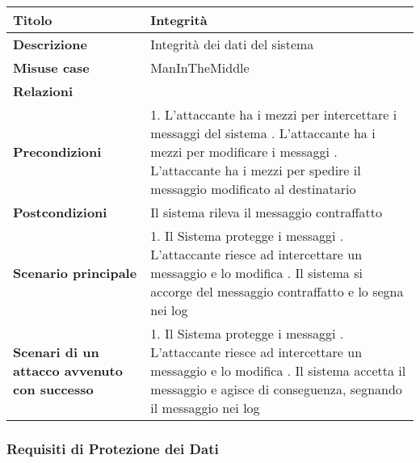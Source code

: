 \begin{tabular} {|P{4cm}|P{11.5cm}|}
  \hline
  \textbf{Titolo}                                      & Integrità                                     \\
  \hline
  \textbf{Descrizione}                                 & Integrità dei dati del sistema                \\
  \hline
  \textbf{Misuse case}                                 & ManInTheMiddle                                \\
  \hline
  \textbf{Relazioni}                                   &                                               \\
  \hline
  \textbf{Precondizioni}                               & 1. L'attaccante ha i mezzi per intercettare i
  messaggi del sistema . L'attaccante ha i mezzi per modificare i messaggi
  . L'attaccante ha i mezzi per spedire il messaggio modificato al
  destinatario                                                                                         \\
  \hline
  \textbf{Postcondizioni}                              & Il sistema rileva il messaggio contraffatto   \\
  \hline
  \textbf{Scenario principale}                         & 1. Il Sistema protegge i messaggi . L'attaccante riesce ad intercettare un messaggio e lo modifica . Il
  sistema si accorge del messaggio contraffatto e lo segna nei log                                     \\
  \hline
  \textbf{Scenari di un attacco avvenuto con successo} & 1. Il Sistema protegge
  i messaggi . L'attaccante riesce ad intercettare un messaggio e
  lo modifica . Il sistema accetta il messaggio e agisce di conseguenza,
  segnando il messaggio nei log                                                                        \\
  \hline
\end{tabular}
\hfill
\break

\clearpage
\subsubsection{Requisiti di Protezione dei Dati}

